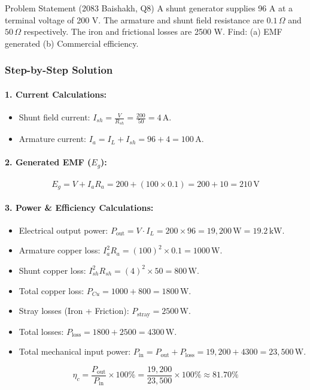 \documentclass[11pt,a4paper,oneside]{article}
\begin{document}
\begin{questionbox}{Problem Statement (2083 Baishakh, Q8)}
A shunt generator supplies 96 A at a terminal voltage of 200 V. The armature and shunt field resistance are $0.1\,\Omega$ and $50\,\Omega$ respectively. The iron and frictional losses are 2500 W. Find:
(a) EMF generated \quad (b) Commercial efficiency.
\end{questionbox}

\subsubsection*{Step-by-Step Solution}
\paragraph{1. Current Calculations:}
\begin{itemize}[leftmargin=1.5em]
  \item Shunt field current: $I_{sh} = \frac{V}{R_{sh}} = \frac{200}{50} = 4\,\mathrm{A}$.
  \item Armature current: $I_a = I_L + I_{sh} = 96 + 4 = 100\,\mathrm{A}$.
\end{itemize}
\paragraph{2. Generated EMF ($E_g$):}
\begin{equation}
  E_g = V + I_a R_a = 200 + (100 \times 0.1) = 200 + 10 = 210\,\mathrm{V}
\end{equation}
\paragraph{3. Power \& Efficiency Calculations:}
\begin{itemize}[leftmargin=1.5em]
  \item Electrical output power: $P_{\text{out}} = V \cdot I_L = 200 \times 96 = 19,200\,\mathrm{W} = 19.2\,\mathrm{kW}$.
  \item Armature copper loss: $I_a^2 R_a = (100)^2 \times 0.1 = 1000\,\mathrm{W}$.
  \item Shunt copper loss: $I_{sh}^2 R_{sh} = (4)^2 \times 50 = 800\,\mathrm{W}$.
  \item Total copper loss: $P_{Cu} = 1000 + 800 = 1800\,\mathrm{W}$.
  \item Stray losses (Iron + Friction): $P_{\text{stray}} = 2500\,\mathrm{W}$.
  \item Total losses: $P_{\text{loss}} = 1800 + 2500 = 4300\,\mathrm{W}$.
  \item Total mechanical input power: $P_{\text{in}} = P_{\text{out}} + P_{\text{loss}} = 19,200 + 4300 = 23,500\,\mathrm{W}$.
\end{itemize}
\begin{equation}
  \eta_c = \frac{P_{\text{out}}}{P_{\text{in}}} \times 100\% = \frac{19,200}{23,500} \times 100\% \approx 81.70\%
\end{equation}
\end{document}
